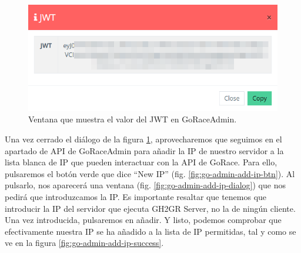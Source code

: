\begin{figure}
    \centering
    \includegraphics[width=0.5\linewidth]{go-admin-add-jwt-value.png}
    \caption{Ventana que muestra el valor del JWT en GoRaceAdmin.}
    \label{fig:go-admin-add-jwt-value}
\end{figure}

Una vez cerrado el diálogo de la figura \ref{fig:go-admin-add-jwt-value}, aprovecharemos que seguimos en el apartado de \acrshort{API} de GoRaceAdmin para añadir la \acrshort{IP} de nuestro servidor a la lista blanca de \acrshort{IP} que pueden interactuar con la \acrshort{API} de GoRace. Para ello, pulsaremos el botón verde que dice ``New IP'' (fig. \ref{fig:go-admin-add-ip-btn}). Al pulsarlo, nos aparecerá una ventana (fig. \ref{fig:go-admin-add-ip-dialog}) que nos pedirá que introduzcamos la \acrshort{IP}. Es importante resaltar que tenemos que introducir la \acrshort{IP} del servidor que ejecuta GH2GR Server, no la de ningún cliente. Una vez introducida, pulsaremos en añadir. Y listo, podemos comprobar que efectivamente nuestra \acrshort{IP} se ha añadido a la lista de \acrshort{IP} permitidas, tal y como se ve en la figura \ref{fig:go-admin-add-ip-success}.

